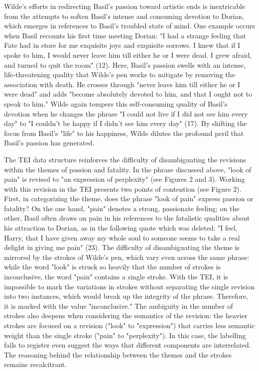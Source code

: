 \documentclass[11pt]{article}
\begin{document}
Wilde's efforts in redirecting Basil's passion toward artistic ends is
inextricable from the attempts to soften Basil's intense and consuming
devotion to Dorian, which emerges in references to Basil's troubled
state of mind. One example occurs when Basil recounts his first time
meeting Dorian: "I had a strange feeling that Fate had in store for me
exquisite joys and exquisite sorrows. I knew that if I spoke to him, I
would never leave him till either he or I were dead. I grew afraid, and
turned to quit the room" (12). Here, Basil's passion swells with an
intense, life-threatening quality that Wilde's pen works to mitigate by
removing the association with death. He crosses through "never leave him
till either he or I were dead" and adds "become absolutely devoted to
him, and that I ought not to speak to him." Wilde again tempers this
self-consuming quality of Basil's devotion when he changes the phrase "I
could not live if I did not see him every day" to "I couldn't be happy
if I didn't see him every day" (17). By shifting the focus from Basil's
"life" to his happiness, Wilde dilutes the profound peril that Basil's
passion has generated.

The TEI data structure reinforces the difficulty of disambiguating the
revisions within the themes of passion and fatality. In the phrase
discussed above, "look of pain" is revised to "an expression of
perplexity" (see Figures 2 and 3). Working with this revision in the
TEI presents two points of contention (see Figure 2). First, in
categorizing the theme, does the phrase "look of pain" express passion
or fatality? On the one hand, "pain" denotes a strong, passionate
feeling; on the other, Basil often draws on pain in his references to
the fatalistic qualities about his attraction to Dorian, as in the
following quote which was deleted: "I feel, Harry, that I have given
away my whole soul to someone seems to take a real delight in giving
me pain" (23). The difficulty of disambiguating the theme is mirrored
by the strokes of Wilde's pen, which vary even across the same phrase:
while the word "look" is struck so heavily that the number of strokes
is inconclusive, the word "pain" contains a single stroke. With the
TEI, it is impossible to mark the variations in strokes without
separating the single revision into two instances, which would break
up the integrity of the phrase. Therefore, it is marked with the value
"inconclusive."  The ambiguity in the number of strokes also deepens
when considering the semantics of the revision: the heavier strokes
are focused on a revision ("look" to "expression") that carries less
semantic weight than the single stroke ("pain" to "perplexity"). In
this case, the labelling fails to register even suggest the ways that
different components are interrelated. The reasoning behind the
relationship between the themes and the strokes remains recalcitrant.
\end{document}
